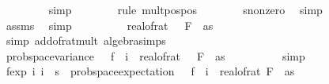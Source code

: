 \begin{isabellebody}
\ \ \ \ \ \ \ \isamarkupfalse%
\ simp\isanewline
\ \ \ \ \ \ \isamarkupfalse%
\ {\isacharparenleft}{\kern0pt}rule\ mult{\isacharunderscore}{\kern0pt}pos{\isacharunderscore}{\kern0pt}pos{\isacharparenright}{\kern0pt}\isanewline
\ \ \ \ \ \ \isamarkupfalse%
\ s{}{\isacharunderscore}{\kern0pt}nonzero\ \isamarkupfalse%
\ simp\isanewline
\ \ \ \ \ \ \isamarkupfalse%
\ assms{\isacharparenleft}{\kern0pt}{}{\isacharparenright}{\kern0pt}\ \isamarkupfalse%
\ simp\isanewline
\ \ \ \ \isamarkupfalse%
\ \isamarkupfalse%
\ {\isachardoublequoteopen}{\isachardot}{\kern0pt}{\isachardot}{\kern0pt}{\isachardot}{\kern0pt}\ {\isacharequal}{\kern0pt}\ {\isacharparenleft}{\kern0pt}real{\isacharunderscore}{\kern0pt}of{\isacharunderscore}{\kern0pt}rat\ {\isacharparenleft}{\kern0pt}{\isasymdelta}\ {\isacharasterisk}{\kern0pt}\ F\ {}\ as{\isacharparenright}{\kern0pt}{\isacharparenright}{\kern0pt}\ {\isacharslash}{\kern0pt}\ {}{\isachardoublequoteclose}\isanewline
\ \ \ \ \ \ \isamarkupfalse%
\ {\isacharparenleft}{\kern0pt}simp\ add{\isacharcolon}{\kern0pt}of{\isacharunderscore}{\kern0pt}rat{\isacharunderscore}{\kern0pt}mult\ algebra{\isacharunderscore}{\kern0pt}simps{\isacharparenright}{\kern0pt}\isanewline
\ \ \ \ \isamarkupfalse%
\ \isamarkupfalse%
\ {\isachardoublequoteopen}prob{\isacharunderscore}{\kern0pt}space{\isachardot}{\kern0pt}variance\ {\isasymOmega}\ {\isacharparenleft}{\kern0pt}{\isasymlambda}{\isasymomega}{\isachardot}{\kern0pt}\ f{}\ {\isasymomega}\ i{\isacharparenright}{\kern0pt}\ {\isasymle}\ {\isacharparenleft}{\kern0pt}real{\isacharunderscore}{\kern0pt}of{\isacharunderscore}{\kern0pt}rat\ {\isacharparenleft}{\kern0pt}{\isasymdelta}\ {\isacharasterisk}{\kern0pt}\ F\ {}\ as{\isacharparenright}{\kern0pt}{\isacharparenright}{\kern0pt}\ {\isacharslash}{\kern0pt}\ {}{\isachardoublequoteclose}\isanewline
\ \ \ \ \ \ \isamarkupfalse%
\ simp\isanewline
\ \ \isamarkupfalse%
\isanewline
\isanewline
\ \ \isamarkupfalse%
\ f{}{\isacharunderscore}{\kern0pt}exp{\isacharprime}{\kern0pt}{\isacharprime}{\kern0pt}{\isacharcolon}{\kern0pt}\ {\isachardoublequoteopen}{\isasymAnd}i{\isachardot}{\kern0pt}\ i\ {\isacharless}{\kern0pt}\ s\ {\isasymLongrightarrow}\ prob{\isacharunderscore}{\kern0pt}space{\isachardot}{\kern0pt}expectation\ {\isasymOmega}\ {\isacharparenleft}{\kern0pt}{\isasymlambda}{\isasymomega}{\isachardot}{\kern0pt}\ f{}\ {\isasymomega}\ i{\isacharparenright}{\kern0pt}\ {\isacharequal}{\kern0pt}\ real{\isacharunderscore}{\kern0pt}of{\isacharunderscore}{\kern0pt}rat\ {\isacharparenleft}{\kern0pt}F\ {}\ as{\isacharparenright}{\kern0pt}{\isachardoublequoteclose}\isanewline

\end{isabellebody}
